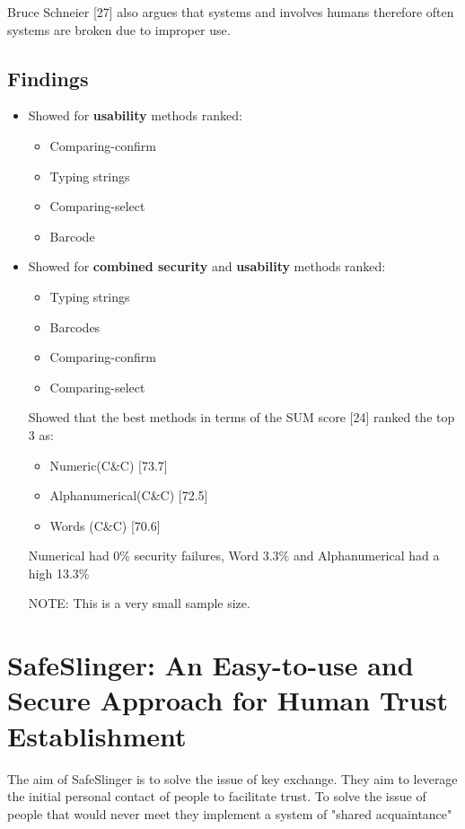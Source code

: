 Bruce Schneier [27] also argues that systems and involves humans therefore often systems are broken due to improper use.


\subsection{Findings}
\begin{itemize}
    \item Showed for \textbf{usability} methods ranked:
    \begin{itemize}
        \item Comparing-confirm
        \item Typing strings
        \item Comparing-select
        \item Barcode
    \end{itemize}

    \item Showed for \textbf{combined security} and \textbf{usability} methods ranked:
    \begin{itemize}
        \item Typing strings
        \item Barcodes
        \item Comparing-confirm
        \item Comparing-select
    \end{itemize}

    Showed that the best methods in terms of the SUM score [24] ranked the top 3 as:
    \begin{itemize}
        \item Numeric(C\&C)          [73.7]
        \item Alphanumerical(C\&C)   [72.5]
        \item Words (C\&C)           [70.6]
    \end{itemize}

    Numerical had 0\% security failures, Word 3.3\% and Alphanumerical had a high 13.3\% 

    NOTE: This is a very small sample size.
\end{itemize}

\newpage
\section{SafeSlinger: An Easy-to-use and Secure Approach for
Human Trust Establishment}

The aim of SafeSlinger is to solve the issue of key exchange. They aim to leverage the initial personal contact of people to facilitate trust. To solve the issue of people that would never meet they implement a system of "shared acquaintance"

